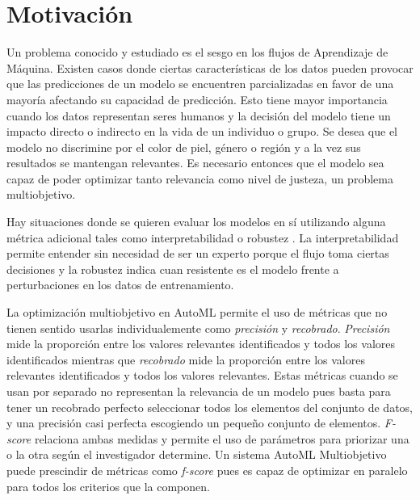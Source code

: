 \section*{Motivaci\'on}
Un problema conocido y estudiado es el sesgo en los flujos de Aprendizaje de M\'aquina. Existen casos donde ciertas caracter\'isticas de los datos pueden provocar que las predicciones de un modelo se encuentren parcializadas en favor de una mayor\'ia   afectando su capacidad de predicci\'on. Esto tiene mayor importancia cuando los datos representan seres humanos y la decisi\'on del modelo tiene un impacto directo o indirecto en la vida de un individuo o grupo. Se desea que el modelo no discrimine por el color de piel, g\'enero o regi\'on y a la vez sus resultados se mantengan relevantes. Es necesario entonces que el modelo sea capaz de poder optimizar tanto  relevancia como  nivel de justeza, un problema multiobjetivo.

Hay situaciones donde se quieren evaluar los modelos en s\'i utilizando alguna m\'etrica adicional tales como interpretabilidad  o robustez . La interpretabilidad permite entender sin necesidad de ser un experto porque el flujo toma ciertas decisiones y la robustez indica cuan resistente es el modelo frente a perturbaciones en los datos de entrenamiento. 

La optimizaci\'on multiobjetivo en AutoML permite el uso de m\'etricas que no tienen sentido usarlas individualemente como \textit{precisi\'on} y \textit{recobrado}. 
 \textit{Precisi\'on} mide la proporci\'on entre los valores relevantes identificados y todos los valores identificados
 mientras que \textit{recobrado} mide la proporci\'on entre los valores relevantes identificados y todos los valores relevantes.
Estas m\'etricas cuando se usan por separado no representan la relevancia de un modelo pues basta para tener un recobrado perfecto seleccionar todos los elementos del conjunto de datos, y una precisi\'on casi perfecta escogiendo un pequeño conjunto de elementos.
\textit{F-score} relaciona ambas medidas y permite el uso de  par\'ametros para priorizar una o la otra seg\'un el investigador determine. 
Un sistema AutoML Multiobjetivo puede prescindir de m\'etricas como \textit{f-score} pues es capaz de optimizar en paralelo para todos los criterios que la componen.

